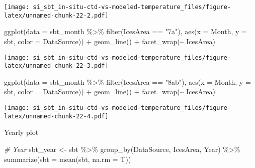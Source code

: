 \documentclass[
]{article}
\newenvironment{Shaded}{\begin{snugshade}}{\end{snugshade}}
\newcommand{\AttributeTok}[1]{\textcolor[rgb]{0.77,0.63,0.00}{#1}}
\newcommand{\CommentTok}[1]{\textcolor[rgb]{0.56,0.35,0.01}{\textit{#1}}}
\newcommand{\FunctionTok}[1]{\textcolor[rgb]{0.00,0.00,0.00}{#1}}
\newcommand{\NormalTok}[1]{#1}
\newcommand{\OtherTok}[1]{\textcolor[rgb]{0.56,0.35,0.01}{#1}}
\newcommand{\SpecialCharTok}[1]{\textcolor[rgb]{0.00,0.00,0.00}{#1}}
\newcommand{\StringTok}[1]{\textcolor[rgb]{0.31,0.60,0.02}{#1}}
\begin{document}
\texttt{[image: si\_sbt\_in-situ-ctd-vs-modeled-temperature\_files/figure-latex/unnamed-chunk-22-2.pdf]}

\begin{Shaded}
\begin{Highlighting}[]
\FunctionTok{ggplot}\NormalTok{(}\AttributeTok{data =}\NormalTok{ sbt\_month }\SpecialCharTok{\%\textgreater{}\%} \FunctionTok{filter}\NormalTok{(IcesArea }\SpecialCharTok{==} \StringTok{"7a"}\NormalTok{), }\FunctionTok{aes}\NormalTok{(}\AttributeTok{x =}\NormalTok{ Month, }\AttributeTok{y =}\NormalTok{ sbt, }\AttributeTok{color =}\NormalTok{ DataSource)) }\SpecialCharTok{+} \FunctionTok{geom\_line}\NormalTok{() }\SpecialCharTok{+} \FunctionTok{facet\_wrap}\NormalTok{(}\SpecialCharTok{\textasciitilde{}}\NormalTok{ IcesArea)}
\end{Highlighting}
\end{Shaded}

\texttt{[image: si\_sbt\_in-situ-ctd-vs-modeled-temperature\_files/figure-latex/unnamed-chunk-22-3.pdf]}

\begin{Shaded}
\begin{Highlighting}[]
\FunctionTok{ggplot}\NormalTok{(}\AttributeTok{data =}\NormalTok{ sbt\_month }\SpecialCharTok{\%\textgreater{}\%} \FunctionTok{filter}\NormalTok{(IcesArea }\SpecialCharTok{==} \StringTok{"8ab"}\NormalTok{), }\FunctionTok{aes}\NormalTok{(}\AttributeTok{x =}\NormalTok{ Month, }\AttributeTok{y =}\NormalTok{ sbt, }\AttributeTok{color =}\NormalTok{ DataSource)) }\SpecialCharTok{+} \FunctionTok{geom\_line}\NormalTok{() }\SpecialCharTok{+} \FunctionTok{facet\_wrap}\NormalTok{(}\SpecialCharTok{\textasciitilde{}}\NormalTok{ IcesArea) }
\end{Highlighting}
\end{Shaded}

\texttt{[image: si\_sbt\_in-situ-ctd-vs-modeled-temperature\_files/figure-latex/unnamed-chunk-22-4.pdf]}

Yearly plot

\begin{Shaded}
\begin{Highlighting}[]
\CommentTok{\# Year}
\NormalTok{sbt\_year }\OtherTok{\textless{}{-}}\NormalTok{ sbt }\SpecialCharTok{\%\textgreater{}\%} \FunctionTok{group\_by}\NormalTok{(DataSource, IcesArea, Year) }\SpecialCharTok{\%\textgreater{}\%} \FunctionTok{summarize}\NormalTok{(}\AttributeTok{sbt =} \FunctionTok{mean}\NormalTok{(sbt, }\AttributeTok{na.rm =}\NormalTok{ T))}
\end{Highlighting}
\end{Shaded}
\end{document}
